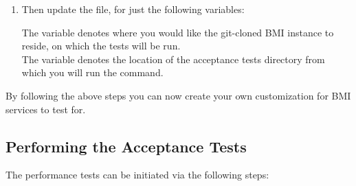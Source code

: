 \begin{enumerate}
\item Then update the  file, for just the following variables: 

      The  variable denotes where you would like the git-cloned BMI instance to reside, on which the tests will be run. \\

   The  variable denotes the location of the acceptance
   tests directory from which you will run the  command. \\
\end{enumerate}

By following the above steps you can now create your own customization for BMI services to test for.


\subsection{Performing the Acceptance Tests \\} 

The performance tests can be initiated via the following steps: 

